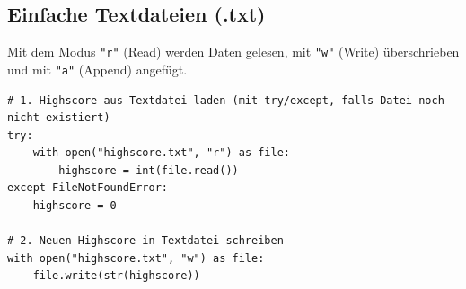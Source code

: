 \subsection{Einfache Textdateien (.txt)}
Mit dem Modus \lstinline|"r"| (Read) werden Daten gelesen, mit \lstinline|"w"| (Write) überschrieben und mit \lstinline|"a"| (Append) angefügt.

\begin{mydefinition}
\begin{lstlisting}
# 1. Highscore aus Textdatei laden (mit try/except, falls Datei noch nicht existiert)
try:
    with open("highscore.txt", "r") as file:
        highscore = int(file.read())
except FileNotFoundError:
    highscore = 0

# 2. Neuen Highscore in Textdatei schreiben
with open("highscore.txt", "w") as file:
    file.write(str(highscore))
\end{lstlisting}
\end{mydefinition}

